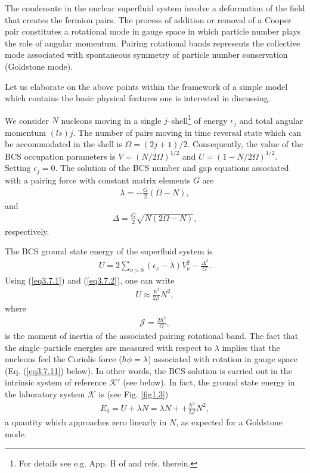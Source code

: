 The condensate in the nuclear superfluid system involve a deformation of the field that creates the fermion pairs. The process of addition or removal of a Cooper pair constitutes a rotational mode in gauge space in which particle number plays the role of angular momentum. Pairing rotational bands represents the collective mode associated with spontaneous symmetry of particle number conservation (Goldstone mode).


Let us elaborate on the above points within the framework of a simple model which contains the basic physical features one is interested in discussing.


We consider $N$ nucleons moving in a single $j$--shell\footnote{For details see e.g. App. H of \cite{Brink:05} and refs. therein.} of energy $\epsilon_j$ and total angular momentum $(ls)j$. The number of pairs moving in time reversal state which can be accommodated in the shell is $\Omega=(2j+1)/2$. Consequently, the value of the BCS occupation parameters is $V=(N/2\Omega)^{1/2}$ and $U=(1-N/2\Omega)^{1/2}$. Setting $\epsilon_j=0$. The solution of the BCS number and gap equations associated with a pairing force with constant matrix elements $G$ are
  \begin{align}\label{eq3.7.1}
  \lambda=-\frac{G}{2}(\Omega-N),
  \end{align}
  and
  \begin{align}\label{eq3.7.2}
\Delta=\frac{G}{2}\sqrt{N(2\Omega-N)},
  \end{align}
respectively.


The BCS ground state energy of the superfluid system is
  \begin{align}\label{eq3.7.3}
U=2\sum_{\nu>0}(\epsilon_\nu-\lambda)V^2_\nu-\frac{\Delta^2}{G}.
  \end{align}
Using (\ref{eq3.7.1}) and (\ref{eq3.7.2}), one can write
  \begin{align}\label{eq3.7.4}
U\approx\frac{\hbar^2}{2\mathcal J}N^2,  
    \end{align}
where
  \begin{align}\label{eq3.7.5}
\mathcal J=\frac{2\hbar^2}{G},  
    \end{align}
is the moment of inertia of the associated pairing rotational band. The fact that the single--particle energies are measured with respect to $\lambda$ implies that the nucleons feel the Coriolis force ($\hbar\dot{\phi}=\lambda$) associated with rotation in gauge space (Eq. (\ref{eq3.7.11}) below). In other words, the BCS solution is carried out in the intrinsic system of reference $\mathcal K'$ (see below). In fact, the ground state energy in the laboratory system $\mathcal K$ is (see Fig. \ref{fig1.3})
  \begin{align}\label{eq3.7.6}
E_0=U+\lambda N=\lambda N++\frac{\hbar^2}{2\mathcal J}N^2,  
    \end{align}
a quantity which approaches zero linearly in $N$, as expected for a Goldstone mode.















